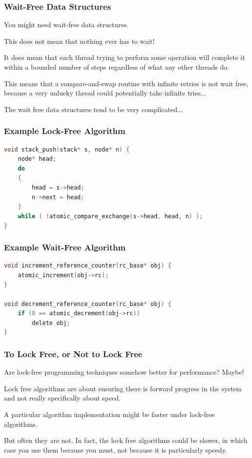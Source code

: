 \begin{frame}
\frametitle{Wait-Free Data Structures}

You might need wait-free data structures. 

This does not mean that nothing ever has to wait! 

It does mean that each thread trying to perform some operation will complete it within a bounded number of steps regardless of what any other threads do. 

This means that a compare-and-swap routine with infinite retries is not wait free, because a very unlucky thread could potentially take infinite tries...

The wait free data structures tend to be very complicated...

\end{frame}


\begin{frame}[fragile]
\frametitle{Example Lock-Free Algorithm}

\begin{lstlisting}[language=C]
void stack_push(stack* s, node* n) {
    node* head;
    do
    {
        head = s->head;
        n->next = head;
    }
    while ( !atomic_compare_exchange(s->head, head, n) );
} 
\end{lstlisting}

\end{frame}

\begin{frame}[fragile]
\frametitle{Example Wait-Free Algorithm}

\begin{lstlisting}[language=C]
void increment_reference_counter(rc_base* obj) {
    atomic_increment(obj->rc);
}

void decrement_reference_counter(rc_base* obj) {
    if (0 == atomic_decrement(obj->rc))
        delete obj;
} 
\end{lstlisting}

\end{frame}


\begin{frame}
\frametitle{To Lock Free, or Not to Lock Free}

Are lock-free programming techniques somehow better for performance? Maybe!

Lock free algorithms are about ensuring there is forward progress in the system and not really specifically about speed. 

A particular algorithm implementation might be faster under lock-free algorithms.

But often they are not. In fact, the lock free algorithms could be slower, in which case you use them because you must, not because it is particularly speedy.

\end{frame}




